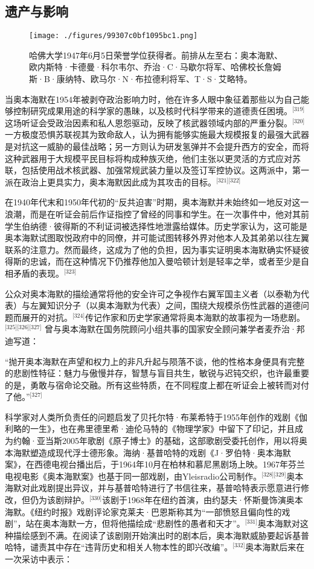 \subsection{遗产与影响}
\begin{figure}[ht]
\centering
\texttt{[image: ./figures/99307c0bf1095bc1.png]}
\caption{哈佛大学1947年6月5日荣誉学位获得者。前排从左至右：奥本海默、欧内斯特·卡德曼·科尔韦尔、乔治·C·马歇尔将军、哈佛校长詹姆斯·B·康纳特、欧马尔·N·布拉德利将军、T·S·艾略特。} \label{fig_ABHM_15}
\end{figure}
当奥本海默在1954年被剥夺政治影响力时，他在许多人眼中象征着那些以为自己能够控制研究成果用途的科学家的愚昧，以及核时代科学带来的道德责任困境。\(^\text{[319]}\)这场听证会受政治因素和私人恩怨驱动，反映了核武器领域内部的严重分裂。\(^\text{[320]}\)一方极度恐惧苏联视其为致命敌人，认为拥有能够实施最大规模报复的最强大武器是对抗这一威胁的最佳战略；另一方则认为研发氢弹并不会提升西方的安全，而将这种武器用于大规模平民目标将构成种族灭绝，他们主张以更灵活的方式应对苏联，包括使用战术核武器、加强常规武装力量以及签订军控协议。这两派中，第一派在政治上更具实力，奥本海默因此成为其攻击的目标。\(^\text{[321][322]}\)

在1940年代末和1950年代初的“反共迫害”时期，奥本海默并未始终如一地反对这一浪潮，而是在听证会前后作证指控了曾经的同事和学生。在一次事件中，他对其前学生伯纳德·彼得斯的不利证词被选择性地泄露给媒体。历史学家认为，这可能是奥本海默试图取悦政府中的同僚，并可能试图转移外界对他本人及其弟弟以往左翼联系的注意力。然而最终，这成为了他的负担，因为事实证明奥本海默确实怀疑彼得斯的忠诚，而在这种情况下仍推荐他加入曼哈顿计划是轻率之举，或者至少是自相矛盾的表现。\(^\text{[323]}\)

公众对奥本海默的描绘通常将他的安全许可之争视作右翼军国主义者（以泰勒为代表）与左翼知识分子（以奥本海默为代表）之间，围绕大规模杀伤性武器的道德问题而展开的对抗。\(^\text{[324]}\)传记作家和历史学家通常将奥本海默的故事视为一场悲剧。\(^\text{[325][326][327]}\) 曾与奥本海默在国务院顾问小组共事的国家安全顾问兼学者麦乔治·邦迪写道：

“抛开奥本海默在声望和权力上的非凡升起与陨落不谈，他的性格本身便具有完整的悲剧性特征：魅力与傲慢并存，智慧与盲目共生，敏锐与迟钝交织，也许最重要的是，勇敢与宿命论交融。所有这些特质，在不同程度上都在听证会上被转而对付了他。”\(^\text{[327]}\)

科学家对人类所负责任的问题启发了贝托尔特·布莱希特于1955年创作的戏剧《伽利略的一生》，也在弗里德里希·迪伦马特的《物理学家》中留下了印记，并且成为约翰·亚当斯2005年歌剧《原子博士》的基础，这部歌剧受委托创作，用以将奥本海默塑造成现代浮士德形象。海纳·基普哈特的戏剧《J·罗伯特·奥本海默案》，在西德电视台播出后，于1964年10月在柏林和慕尼黑剧场上映。1967年芬兰电视电影《奥本海默案》也基于同一部戏剧，由Yleisradio公司制作。\(^\text{[328][329]}\)奥本海默对此戏剧提出异议，并与基普哈特进行了书信往来，基普哈特表示愿意进行修改，但仍为该剧辩护。\(^\text{[330]}\)该剧于1968年在纽约首演，由约瑟夫·怀斯曼饰演奥本海默。《纽约时报》戏剧评论家克莱夫·巴恩斯称其为“一部愤怒且偏向性的戏剧”，站在奥本海默一方，但将他描绘成“悲剧性的愚者和天才”。\(^\text{[331]}\)奥本海默对这种描绘感到不满。在阅读了该剧刚开始演出时的剧本后，奥本海默威胁要起诉基普哈特，谴责其中存在“违背历史和相关人物本性的即兴改编”。\(^\text{[332]}\)奥本海默后来在一次采访中表示：

